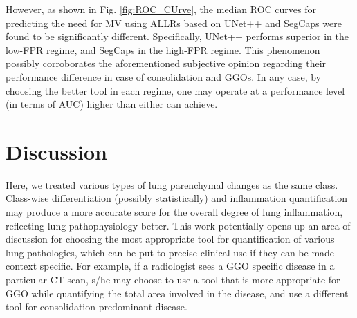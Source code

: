 However, as shown in Fig. \ref{fig:ROC_CUrve}, the median ROC curves for predicting the need for MV using ALLRs based on UNet++ and SegCaps were found to be significantly different. Specifically, UNet++ performs superior in the low-FPR regime, and SegCaps in the high-FPR regime. This phenomenon possibly corroborates the aforementioned subjective opinion regarding their performance difference in case of consolidation and GGOs. In any case, by choosing the better tool in each regime, one may operate at a performance level (in terms of AUC) higher than either can achieve.   




\section{Discussion}

Here, we treated various types of lung parenchymal changes as the same class.
Class-wise differentiation (possibly statistically) and inflammation quantification may produce a more accurate score for the overall degree of lung inflammation, reflecting lung pathophysiology better. This work potentially opens up an area of discussion for choosing the most appropriate tool for quantification of various lung pathologies, which can be put to precise clinical use if they can be made context specific. For example, if a radiologist sees a GGO specific disease in a particular CT scan, s/he may choose to use a tool that is more appropriate for GGO while quantifying the total area involved in the disease, and use a different tool for consolidation-predominant disease. 